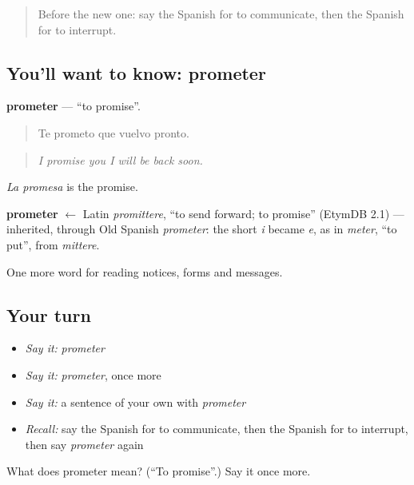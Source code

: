 \begin{quote}
Before the new one: say the Spanish for to communicate, then the Spanish for to interrupt.
\end{quote}

\subsection*{You'll want to know: prometer}
\textbf{prometer} — \textquotedblleft{}to promise\textquotedblright{}.

\begin{quote}
Te prometo que vuelvo pronto.
\end{quote}

\begin{quote}
\emph{I promise you I will be back soon.}
\end{quote}

\emph{La promesa} is the promise.

\begin{cousinweb}
\textbf{prometer} $\leftarrow$ Latin \emph{promittere}, \textquotedblleft{}to send forward; to promise\textquotedblright{} (EtymDB 2.1) — inherited, through Old Spanish \emph{prometer}: the short \emph{i} became \emph{e}, as in \emph{meter}, \textquotedblleft{}to put\textquotedblright{}, from \emph{mittere}.
\end{cousinweb}

\begin{grammarlens}[title={What you've built}]
One more word for reading notices, forms and messages.
\end{grammarlens}

\subsection*{Your turn}
\begin{itemize}
\raggedright
  \item \emph{Say it:} \emph{prometer}
  \item \emph{Say it:} \emph{prometer}, once more
  \item \emph{Say it:} a sentence of your own with \emph{prometer}
  \item \emph{Recall:} say the Spanish for to communicate, then the Spanish for to interrupt, then say \emph{prometer} again
\end{itemize}

\begin{tcolorbox}[breakable,colback=teal!4,colframe=teal!35!black,title={Before you move on}]
What does prometer mean? (\textquotedblleft{}To promise\textquotedblright{}.) Say it once more.
\end{tcolorbox}
